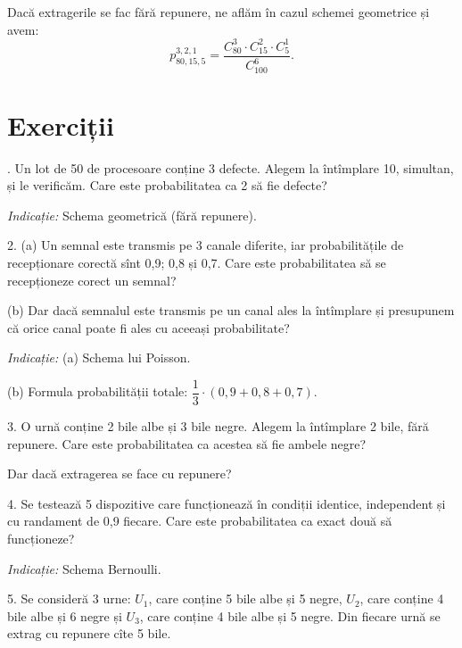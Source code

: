\documentclass[12pt,a4paper]{article}
\theoremstyle{dotless}
\theoremstyle{dotlessdr}
\begin{document}
Dacă extragerile se fac fără repunere, ne aflăm în cazul schemei geometrice și avem:
\[
  p_{80, 15, 5}^{3, 2, 1} = \frac{C_{80}^3 \cdot C_{15}^2 \cdot C_5^1}{C_{100}^6}.
\]



\section*{Exerciții}

\indent{}. Un lot de 50 de procesoare conține 3 defecte. Alegem la întîmplare
10, simultan, și le verificăm. Care este probabilitatea ca 2 să fie defecte?

\emph{Indicație:} Schema geometrică (fără repunere).

\vspace{1cm}

2. (a) Un semnal este transmis pe 3 canale diferite, iar probabilitățile de
recepționare corectă sînt 0,9; 0,8 și 0,7. Care este probabilitatea să se
recepționeze corect un semnal?

(b) Dar dacă semnalul este transmis pe un canal ales la întîmplare și presupunem
că orice canal poate fi ales cu aceeași probabilitate?

\emph{Indicație:} (a) Schema lui Poisson.

(b) Formula probabilității totale: $ \dfrac{1}{3} \cdot (0,9 + 0,8 + 0,7) $.

\vspace{1cm}

3. O urnă conține 2 bile albe și 3 bile negre. Alegem la întîmplare 2 bile,
fără repunere. Care este probabilitatea ca acestea să fie ambele negre?

Dar dacă extragerea se face cu repunere?

\vspace{1cm}

4. Se testează 5 dispozitive care funcționează în condiții identice, independent
și cu randament de 0,9 fiecare. Care este probabilitatea ca exact două să
funcționeze?

\emph{Indicație:} Schema Bernoulli.

\vspace{1cm}

5. Se consideră 3 urne: $ U_1 $, care conține 5 bile albe și 5 negre, $ U_2 $,
care conține 4 bile albe și 6 negre și $ U_3 $, care conține 4 bile albe
și 5 negre. Din fiecare urnă se extrag cu repunere cîte 5 bile.
\end{document}

